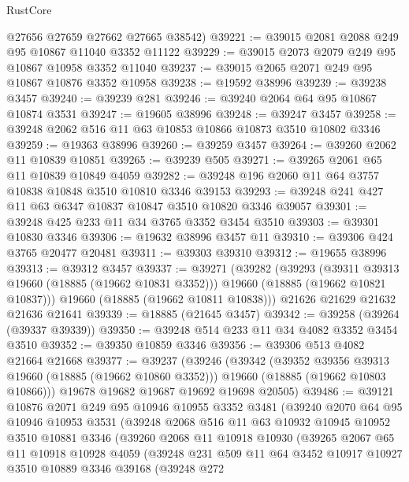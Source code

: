 \begin{lexlean}{RustCore}
\begin{coremodule}
      @27656
      @27659
      @27662
      @27665
      @38542)
@39221 := @39015 @2081 @2088 @249 @95 @10867 @11040 @3352 @11122
@39229 := @39015 @2073 @2079 @249 @95 @10867 @10958 @3352 @11040
@39237 := @39015 @2065 @2071 @249 @95 @10867 @10876 @3352 @10958
@39238 := @19592 @38996
@39239 := @39238 @3457
@39240 := @39239 @281
@39246 := @39240 @2064 @64 @95 @10867 @10874 @3531
@39247 := @19605 @38996
@39248 := @39247 @3457
@39258 := @39248 @2062 @516 @11 @63 @10853 @10866 @10873 @3510 @10802 @3346
@39259 := @19363 @38996
@39260 := @39259 @3457
@39264 := @39260 @2062 @11 @10839 @10851
@39265 := @39239 @505
@39271 := @39265 @2061 @65 @11 @10839 @10849 @4059
@39282 := @39248 @196 @2060 @11 @64 @3757 @10838 @10848 @3510 @10810 @3346 @39153
@39293 := @39248 @241 @427 @11 @63 @6347 @10837 @10847 @3510 @10820 @3346 @39057
@39301 := @39248 @425 @233 @11 @34 @3765 @3352 @3454 @3510
@39303 := @39301 @10830 @3346
@39306 := @19632 @38996 @3457 @11
@39310 := @39306 @424 @3765 @20477 @20481
@39311 := @39303 @39310
@39312 := @19655 @38996
@39313 := @39312 @3457
@39337 := @39271
    (@39282
      (@39293
        (@39311 @39313 @19660 (@18885 (@19662 @10831 @3352)))
        @19660
        (@18885 (@19662 @10821 @10837)))
      @19660
      (@18885 (@19662 @10811 @10838)))
    @21626
    @21629
    @21632
    @21636
    @21641
@39339 := @18885 (@21645 @3457)
@39342 := @39258 (@39264 (@39337 @39339))
@39350 := @39248 @514 @233 @11 @34 @4082 @3352 @3454 @3510
@39352 := @39350 @10859 @3346
@39356 := @39306 @513 @4082 @21664 @21668
@39377 := @39237
    (@39246
      (@39342
        (@39352 @39356 @39313 @19660 (@18885 (@19662 @10860 @3352)))
        @19660
        (@18885 (@19662 @10803 @10866)))
      @19678
      @19682
      @19687
      @19692
      @19698
      @20505)
@39486 := @39121
    @10876
    @2071
    @249
    @95
    @10946
    @10955
    @3352
    @3481
    (@39240
      @2070
      @64
      @95
      @10946
      @10953
      @3531
      (@39248
        @2068
        @516
        @11
        @63
        @10932
        @10945
        @10952
        @3510
        @10881
        @3346
        (@39260
          @2068
          @11
          @10918
          @10930
          (@39265
            @2067
            @65
            @11
            @10918
            @10928
            @4059
            (@39248
              @231
              @509
              @11
              @64
              @3452
              @10917
              @10927
              @3510
              @10889
              @3346
              @39168
              (@39248
                @272

\end{coremodule}
\end{lexlean}
